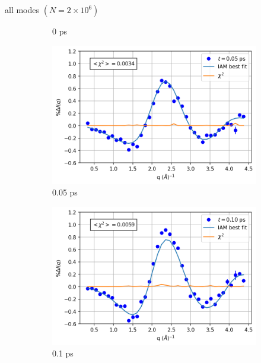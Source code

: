 \documentclass{beamer}
\newcommand\w{0.32}
\begin{document}
\begin{frame}{all modes $(N= 2\times10^6)$}
\begin{figure}
\begin{subfigure}[b]{\w\textwidth}
			\caption{0 ps}
		\end{subfigure}
		\begin{subfigure}[b]{\w\textwidth}
			\centering
			\includegraphics[width=\textwidth]{figures/1000000_allmodes_0.05.png}
			\caption{0.05 ps}
		\end{subfigure}
		\begin{subfigure}[b]{\w\textwidth}
			\centering
			\includegraphics[width=\textwidth]{figures/1000000_allmodes_0.10.png}
			\caption{0.1 ps}
		\end{subfigure}
		\begin{subfigure}[b]{\w\textwidth}
			\centering

\end{subfigure}
\end{figure}
\end{frame}
\end{document}
